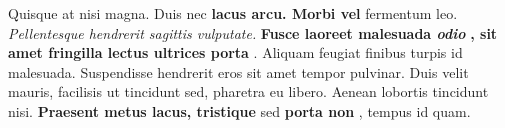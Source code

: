 \documentclass[11pt, letterpaper, openany]{scrbook}
\begin{document}
\begin{sloppypar}

\begin{paracol}{1}
\fontsize{11}{13}\leftfont Quisque at nisi magna. Duis nec \textbf{lacus arcu. Morbi vel} fermentum leo. \textit{Pellentesque hendrerit sagittis vulputate.} \textbf{Fusce laoreet malesuada \textit{odio}} \textbf{, sit amet fringilla lectus ultrices porta} . Aliquam feugiat finibus turpis id malesuada. Suspendisse hendrerit eros sit amet tempor pulvinar. Duis velit mauris, facilisis ut tincidunt sed, pharetra eu libero. Aenean lobortis tincidunt nisi. \textbf{Praesent metus lacus, tristique} sed \textbf{porta non} , tempus id quam.\switchcolumn 

\end{paracol}
\end{sloppypar}
\end{document}
